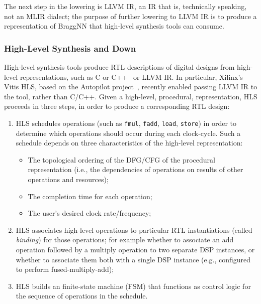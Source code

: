 The next step in the lowering is LLVM IR, an IR that is, technically speaking, not an MLIR dialect; the purpose of further lowering to LLVM IR is to produce a representation of BraggNN that high-level synthesis tools can consume.

\subsubsection{High-Level Synthesis and Down}\label{subsec:hlsdown}

High-level synthesis tools produce RTL descriptions of digital designs from high-level representations, such as C or C++~\cite{10.1145/2514740, ferrandi2021bambu} or LLVM IR.
In particular, Xilinx's Vitis HLS, based on the Autopilot project~\cite{Zhang2008}, recently enabled passing LLVM IR to the tool, rather than C/C++.
Given a high-level, procedural, representation, HLS proceeds in three steps, in order to produce a corresponding RTL design:
\begin{enumerate}
	\item HLS schedules operations (such as \texttt{fmul}, \texttt{fadd}, \texttt{load}, \texttt{store}) in order to determine which operations should occur during each clock-cycle. Such a schedule depends on three characteristics of the high-level representation:
	      \begin{itemize}
		      \item The topological ordering of the DFG/CFG of the procedural representation (i.e., the dependencies of operations on results of other operations and resources);
		      \item The completion time for each operation;
		      \item The user's desired clock rate/frequency;
	      \end{itemize}
	\item HLS associates high-level operations to particular RTL instantiations (called \emph{binding}) for those operations; for example whether to associate an add operation followed by a multiply operation to two separate DSP instances, or whether to associate them both with a single DSP instance (e.g., configured to perform fused-multiply-add);
	\item HLS builds an finite-state machine (FSM) that functions as control logic for the sequence of operations in the schedule.
\end{enumerate}

